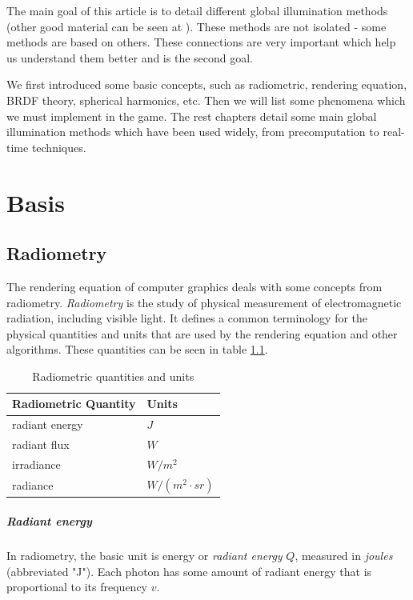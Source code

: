 The main goal of this article is to detail different global illumination methods (other good material can be seen at \cite{a:TheStateoftheArtinInteractiveGlobalIllumination}). These methods are not isolated - some methods are based on others. These connections are very important which help us understand them better and is the second goal.

We first introduced some basic concepts, such as radiometric, rendering equation, BRDF theory, spherical harmonics, etc. Then we will list some phenomena which we must implement in the game. The rest chapters detail some main global illumination methods which have been used widely, from precomputation to real-time techniques.



\chapter{Basis}
\section{Radiometry}
The rendering equation of computer graphics deals with some concepts from radiometry. \textit{Radiometry} is the study of physical measurement of electromagnetic radiation, including visible light. It defines a common terminology for the physical quantities and units that are used by the rendering equation and other algorithms. These quantities can be seen in table \ref{t:radiometric-quantities}.

\begin{table}\label{t:radiometric-quantities}
\centering
	\begin{tabular}{l|l}
  Radiometric Quantity&Units  \\
  \hline
  radiant energy & $J$ \\
  radiant flux & $W$  \\
  irradiance & $W/m^2$ \\
  radiance & $W/(m^2\cdot sr)$
\end{tabular}
\caption{Radiometric quantities and units}
\end{table}

\paragraph{\textbf{Radiant energy}} 
In radiometry, the basic unit is energy or \textit{radiant energy} $Q$, measured in \textit{joules} (abbreviated "J"). Each photon has some amount of radiant energy that is proportional to its frequency $v$.

